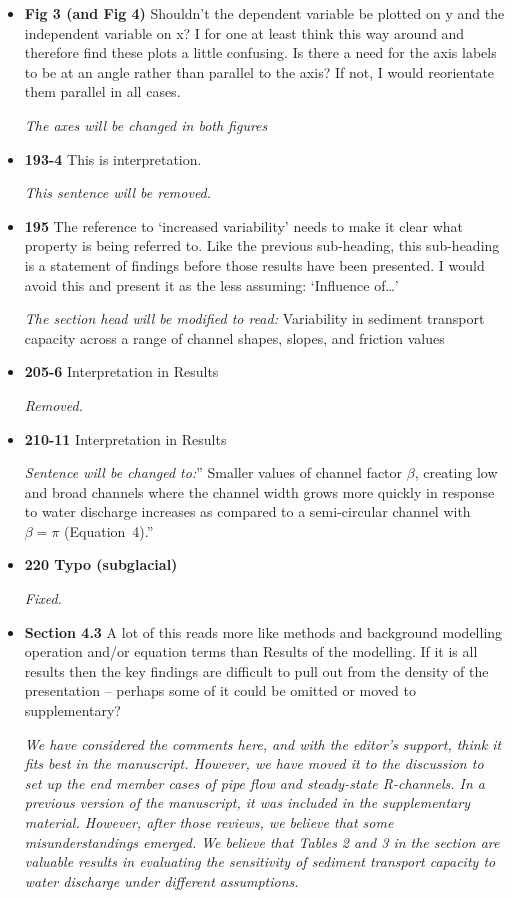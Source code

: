 \documentclass[11pt]{article}
\begin{document}
\begin{itemize}
  
\item \textbf{Fig 3 (and Fig 4)} Shouldn’t the dependent variable be plotted on y and the independent
  variable on x? I for one at least think this way around and therefore find
  these plots a little confusing.
  Is there a need for the axis labels to be at an angle rather than parallel to
  the axis? If not, I would reorientate them parallel in all cases.

  \textit{The axes will be changed in both figures}
  
\item \textbf{193-4} This is interpretation.

  \textit{This sentence will be removed.}
  
\item \textbf{195} The reference to ‘increased variability’ needs to make it clear what property
  is being referred to. Like the previous sub-heading, this sub-heading is a
  statement of findings before those results have been presented. I would
  avoid this and present it as the less assuming: ‘Influence of…’


  \textit{The section head will be modified to read:} Variability in sediment transport capacity across a range of channel shapes, slopes, and friction values

\item \textbf{205-6} Interpretation in Results

  \textit{Removed.}
  
\item \textbf{210-11} Interpretation in Results

  \textit{ Sentence will be changed to:}'' Smaller values of channel factor $\beta$, creating low and broad channels where the channel width grows more quickly in response to water discharge increases as compared to a semi-circular channel with $\beta = \pi$ (Equation~4).''
  
\item \textbf{220 Typo (subglacial)}


  \textit{Fixed.}
  
\item \textbf{Section 4.3} A lot of this reads more like methods and background modelling operation
  and/or equation terms than Results of the modelling. If it is all results then
  the key findings are difficult to pull out from the density of the presentation
  – perhaps some of it could be omitted or moved to supplementary?

  \textit{We have considered the comments here, and with the editor's support, think it fits best in the manuscript.
  However, we have moved it to the discussion to set up the end member cases of pipe flow and steady-state R-channels.
    In a previous version of the manuscript, it was included in the supplementary material. However, after those reviews, we believe that some misunderstandings emerged. We believe that Tables 2 and 3 in the section are valuable results in evaluating the sensitivity of sediment transport capacity to water discharge under different assumptions.
  }


\end{itemize}
\end{document}
